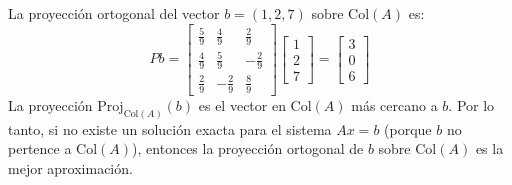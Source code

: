 \begin{enumerate}[label=\color{red}\textbf{\arabic*)}]
\begin{enumerate}[label=Paso \arabic*:]
La proyección ortogonal del vector $b=(1,2,7)$ sobre  $\mathrm{Col}(A)$ es: \[
Pb=\begin{bmatrix} 
        \frac{5}{9} & \frac{4}{9} & \frac{2}{9} \\
        \frac{4}{9} & \frac{5}{9} & -\frac{2}{9} \\
        \frac{2}{9} & -\frac{2}{9} & \frac{8}{9} 
\end{bmatrix} \begin{bmatrix} 
1\\2\\7 
\end{bmatrix} =\begin{bmatrix} 
3\\0\\6 
\end{bmatrix} 
\] 
La proyección $\mathrm{Proj}_{\mathrm{Col}(A)}(b)$ es el vector en $\mathrm{Col}(A)$ más cercano a $b$. Por lo tanto, si no existe un solución exacta para el sistema  $Ax=b$ (porque $b$ no pertence a  $\mathrm{Col}(A)$), entonces la proyección ortogonal de $b$ sobre $\mathrm{Col}(A)$ es la mejor aproximación.
\end{enumerate}
\end{enumerate}

